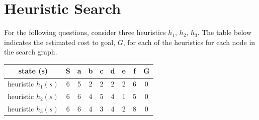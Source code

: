 \documentclass[12pt]{article}
\begin{document}
\newpage
\section{Heuristic Search}
\begin{center}
\end{center}

For the following questions, consider three heuristics $h_1$, $h_2$, $h_3$. The table below indicates the estimated cost to goal, $G$, for each of the heuristics for each node in the search graph.
\begin{center}
  \begin{tabular}{||c c c c c c c c c||}
    \hline
    state (s)          & S & a & b & c & d & e & f & G \\ [0.5ex]
    \hline\hline
    heuristic $h_1(s)$ & 6 & 5 & 2 & 2 & 2 & 2 & 6 & 0 \\
    \hline
    heuristic $h_2(s)$ & 6 & 6 & 4 & 5 & 4 & 1 & 5 & 0 \\
    \hline
    heuristic $h_3(s)$ & 6 & 6 & 4 & 3 & 4 & 2 & 8 & 0 \\
    \hline
  \end{tabular}
\end{center}
\end{document}
